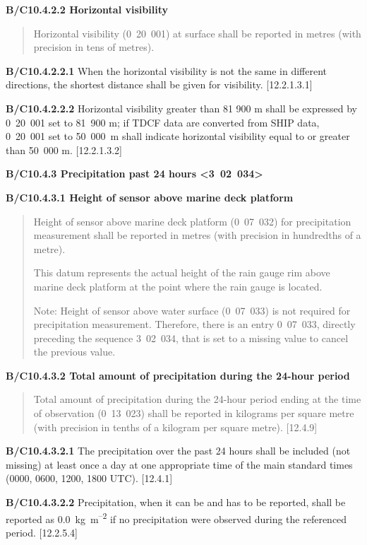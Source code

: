 \textbf{B/C10.4.2.2 Horizontal visibility}

\begin{quote}
Horizontal visibility (0~20~001) at surface shall be reported in metres (with precision in tens of metres).
\end{quote}

\textbf{B/C10.4.2.2.1} When the horizontal visibility is not the same in different directions, the shortest distance shall be given for visibility. {[}12.2.1.3.1{]}

\textbf{B/C10.4.2.2.2} Horizontal visibility greater than 81 900 m shall be expressed by 0~20~001 set to 81~900 m; if TDCF data are converted from SHIP data, 0~20~001 set to 50~000~m shall indicate horizontal visibility equal to or greater than 50~000 m. {[}12.2.1.3.2{]}

\textbf{B/C10.4.3 Precipitation past 24 hours \textless3~02~034\textgreater{}}

\textbf{B/C10.4.3.1 Height of sensor above marine deck platform}

\begin{quote}
Height of sensor above marine deck platform (0~07~032) for precipitation measurement shall be reported in metres (with precision in hundredths of a metre).

This datum represents the actual height of the rain gauge rim above marine deck platform at the point where the rain gauge is located.

Note: Height of sensor above water surface (0~07~033) is not required for precipitation measurement. Therefore, there is an entry 0~07~033, directly preceding the sequence 3~02~034, that is set to a missing value to cancel the previous value.
\end{quote}

\textbf{B/C10.4.3.2 Total amount of precipitation during the 24-hour period}

\begin{quote}
Total amount of precipitation during the 24-hour period ending at the time of observation (0~13~023) shall be reported in kilograms per square metre (with precision in tenths of a kilogram per square metre). {[}12.4.9{]}
\end{quote}

\textbf{B/C10.4.3.2.1} The precipitation over the past 24 hours shall be included (not missing) at least once a day at one appropriate time of the main standard times (0000, 0600, 1200, 1800 UTC). {[}12.4.1{]}

\textbf{B/C10.4.3.2.2} Precipitation, when it can be and has to be reported, shall be reported as 0.0~kg~m\textsuperscript{--2} if no precipitation were observed during the referenced period. {[}12.2.5.4{]}

